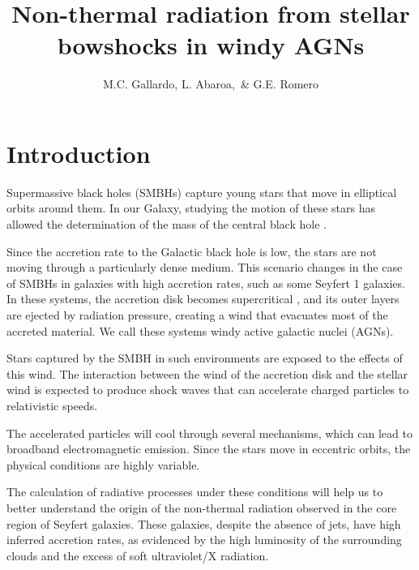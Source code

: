 \documentclass[baaa]{baaa}
\title{Non-thermal radiation from stellar \\ bowshocks in windy AGNs}
\author{
M.C. Gallardo\inst{1,2},
L. Abaroa\inst{1,2},\, \&
G.E. Romero\inst{1,2}
}
\institute{
Facultad de Ciencias Astron\'omicas y Geof{\'\i}sicas, UNLP, Argentina\and   
Instituto Argentino de Radioastronom\'ia, CONICET--CICPBA--UNLP, Argentina
}
\begin{document}
\maketitle



\section{Introduction}\label{S_intro}

Supermassive black holes (SMBHs) capture young stars that move in elliptical orbits around them. In our Galaxy, studying the motion of these stars has allowed the determination of the mass of the central black hole \citep{1996Natur.383..415E,1998ApJ...509..678G,2002MNRAS.331..917E,2012A&A...537A..52E,2022ApJ...933...49P,2022A&A...657L..12G}. 

Since the accretion rate to the Galactic black hole is low, the stars are not moving through a particularly dense medium. This scenario changes in the case of SMBHs in galaxies with high accretion rates, such as some Seyfert 1 galaxies. In these systems, the accretion disk becomes supercritical \citep{2004PASJ...56..569F,2022A&A...664A.178S}, and its outer layers are ejected by radiation pressure, creating a wind that evacuates most of the accreted material. We call these systems windy active galactic nuclei (AGNs).

Stars captured by the SMBH in such environments are exposed to the effects of this wind. The interaction between the wind of the accretion disk and the stellar wind is expected to produce shock waves \citep{2021BAAA...62..262A,2022BAAA...63..265A} that can accelerate charged particles to relativistic speeds.

The accelerated particles will cool through several mechanisms, which can lead to broadband electromagnetic emission. Since the stars move in eccentric orbits, the physical conditions are highly variable.

The calculation of radiative processes under these conditions will help us to better understand the origin of the non-thermal radiation observed in the core region of Seyfert galaxies. These galaxies, despite the absence of jets, have high inferred accretion rates, as evidenced by the high luminosity of the surrounding clouds and the excess of soft ultraviolet/X radiation.
\end{document}
